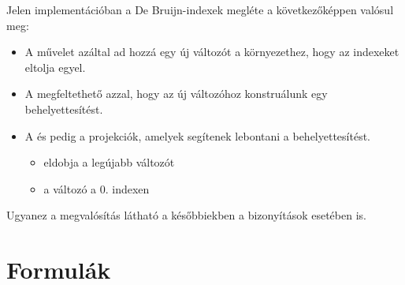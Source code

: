 Jelen implementációban a De Bruijn-indexek megléte a következőképpen valósul meg:

\begin{itemize}
\item A  művelet azáltal ad hozzá egy új változót a környezethez, hogy az indexeket eltolja egyel.
\item A  megfeltethető azzal, hogy az új változóhoz konstruálunk egy behelyettesítést.
\item A  és  pedig a projekciók, amelyek segítenek lebontani a behelyettesítést.
  \begin{itemize}
  \item {} eldobja a legújabb változót
  \item {} a változó a 0. indexen
  \end{itemize}
\end{itemize}

Ugyanez a megvalósítás látható a későbbiekben a bizonyítások esetében is.

\section{Formulák}

